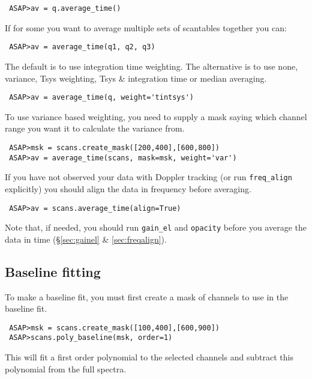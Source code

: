 \documentclass[11pt]{article}
\newcommand{\cmd}[1]{{\tt #1}}
\begin{document}
\begin{verbatim}
 ASAP>av = q.average_time()
\end{verbatim}

If for some you want to average multiple sets of scantables together
you can:

\begin{verbatim}
 ASAP>av = average_time(q1, q2, q3)
\end{verbatim}

The default is to use integration time weighting. The alternative is
to use none, variance, Tsys weighting, Tsys \& integration time or
median averaging.

\begin{verbatim}
 ASAP>av = average_time(q, weight='tintsys')
\end{verbatim}

To use variance based weighting, you need to supply a mask saying which
channel range you want it to calculate the variance from.

\begin{verbatim}
 ASAP>msk = scans.create_mask([200,400],[600,800])
 ASAP>av = average_time(scans, mask=msk, weight='var')
\end{verbatim}

If you have not observed your data with Doppler tracking (or run
\cmd{freq\_align} explicitly) you should align the data in frequency
before averaging.

\begin{verbatim}
 ASAP>av = scans.average_time(align=True)
\end{verbatim}

Note that, if needed, you should run \cmd{gain\_el} and \cmd{opacity}
before you average the data in time (\S \ref{sec:gainel} \&
\ref{sec:freqalign}).

\subsection{Baseline fitting}

To make a baseline fit, you must first create
a mask of channels to use in the baseline fit.

\begin{verbatim}
 ASAP>msk = scans.create_mask([100,400],[600,900])
 ASAP>scans.poly_baseline(msk, order=1)
\end{verbatim}

This will fit a first order polynomial to the selected channels and subtract
this polynomial from the full spectra.
\end{document}
